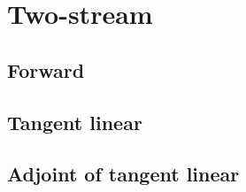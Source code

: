 %
\section{Two-stream}
\label{sec:two_stream}


\subsection{Forward}
\label{sec:two_stream-forward}


%
\subsection{Tangent linear}
\label{sec:two_stream-tangent_linear}


%
\subsection{Adjoint of tangent linear}
\label{sec:two_stream-adjoint_of_tangent_linear}
